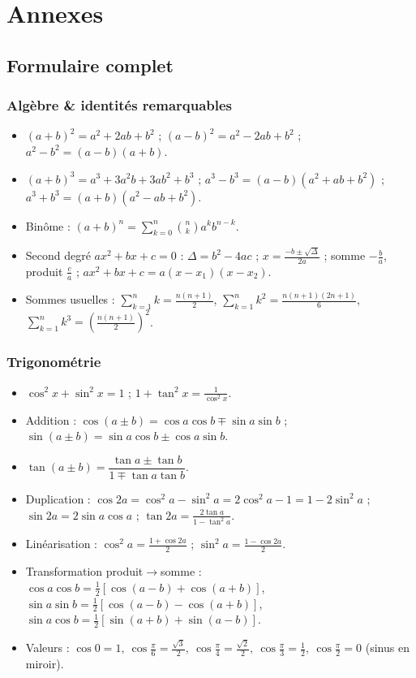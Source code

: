 \chapter{Annexes}

\section{Formulaire complet}

\subsection{Algèbre \& identités remarquables}
\begin{itemize}\setlength\itemsep{2pt}
\item $(a+b)^2=a^2+2ab+b^2$ ; $(a-b)^2=a^2-2ab+b^2$ ; $a^2-b^2=(a-b)(a+b)$.
\item $(a+b)^3=a^3+3a^2b+3ab^2+b^3$ ; $a^3-b^3=(a-b)(a^2+ab+b^2)$ ; $a^3+b^3=(a+b)(a^2-ab+b^2)$.
\item Binôme : $(a+b)^n=\displaystyle\sum_{k=0}^n\binom nk a^k b^{n-k}$.
\item Second degré $ax^2+bx+c=0$ : $\Delta=b^2-4ac$ ; $x=\frac{-b\pm\sqrt\Delta}{2a}$ ; somme $-\frac ba$, produit $\frac ca$ ; $ax^2+bx+c=a(x-x_1)(x-x_2)$.
\item Sommes usuelles : $\displaystyle\sum_{k=1}^n k=\frac{n(n+1)}2$, $\displaystyle\sum_{k=1}^n k^2=\frac{n(n+1)(2n+1)}6$, $\displaystyle\sum_{k=1}^n k^3=\left(\frac{n(n+1)}2\right)^2$.
\end{itemize}

\subsection{Trigonométrie}
\begin{itemize}\setlength\itemsep{2pt}
\item $\cos^2x+\sin^2x=1$ ; $1+\tan^2x=\frac1{\cos^2x}$.
\item Addition : $\cos(a\pm b)=\cos a\cos b\mp\sin a\sin b$ ; $\sin(a\pm b)=\sin a\cos b\pm\cos a\sin b$.
\item $\tan(a\pm b)=\dfrac{\tan a\pm\tan b}{1\mp\tan a\tan b}$.
\item Duplication : $\cos2a=\cos^2a-\sin^2a=2\cos^2a-1=1-2\sin^2a$ ; $\sin2a=2\sin a\cos a$ ; $\tan2a=\frac{2\tan a}{1-\tan^2a}$.
\item Linéarisation : $\cos^2a=\frac{1+\cos2a}2$ ; $\sin^2a=\frac{1-\cos2a}2$.
\item Transformation produit$\to$somme : $\cos a\cos b=\frac12[\cos(a-b)+\cos(a+b)]$, $\sin a\sin b=\frac12[\cos(a-b)-\cos(a+b)]$, $\sin a\cos b=\frac12[\sin(a+b)+\sin(a-b)]$.
\item Valeurs : $\cos0=1,\ \cos\frac\pi6=\frac{\sqrt3}2,\ \cos\frac\pi4=\frac{\sqrt2}2,\ \cos\frac\pi3=\frac12,\ \cos\frac\pi2=0$ (sinus en miroir).
\end{itemize}

